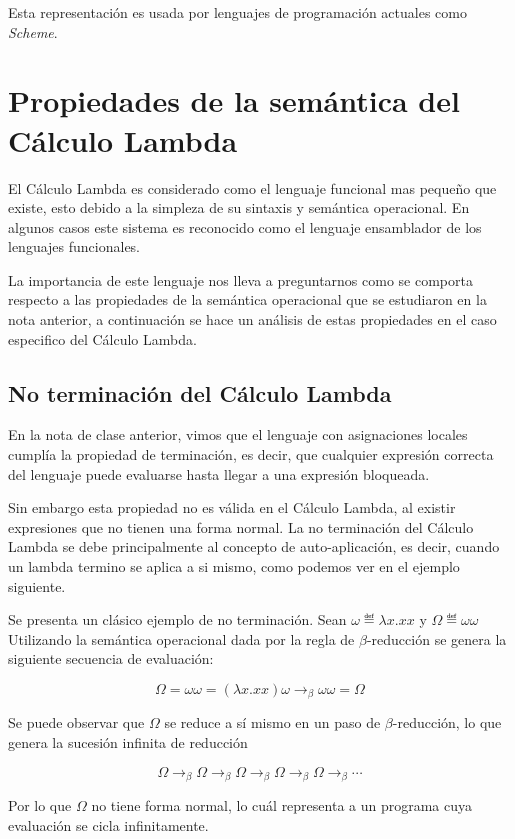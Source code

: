 \documentclass[12pt]{extarticle}
\begin{document}
Esta representación es usada por lenguajes de programación actuales como {\it Scheme}.

\section{Propiedades de la semántica del Cálculo Lambda}
El Cálculo Lambda es considerado como el lenguaje funcional mas pequeño que existe, esto debido a la simpleza de su sintaxis y semántica operacional. En algunos casos este sistema es reconocido como el lenguaje ensamblador de los lenguajes funcionales.

La importancia de este lenguaje nos lleva a preguntarnos como se comporta respecto a las propiedades de la semántica operacional que se estudiaron en la nota anterior, a continuación se hace un análisis de estas propiedades en el caso especifico del Cálculo Lambda.
\subsection{No terminación del Cálculo Lambda}
En la nota de clase anterior, vimos que el lenguaje \ea con asignaciones locales cumplía la propiedad de terminación, es decir, que cualquier expresión correcta del lenguaje puede evaluarse hasta llegar a una expresión bloqueada. 

Sin embargo esta propiedad no es válida en el Cálculo Lambda, al existir expresiones que no tienen una forma normal. La no terminación del Cálculo Lambda se debe principalmente al concepto de auto-aplicación, es decir, cuando un lambda termino se aplica a si mismo, como podemos ver en el ejemplo siguiente.

\begin{example} Se presenta un clásico ejemplo de no terminación. Sean $\omega \eqdef \lambda x.xx$ y $\Omega\eqdef\omega\omega$ Utilizando la semántica operacional dada por la regla de $\beta$-reducción se genera la siguiente secuencia de evaluación:

$$\Omega = \omega\omega=(\lambda x.xx)\omega\to_\beta\omega\omega=\Omega$$

Se puede observar que $\Omega$ se reduce a sí mismo en un paso de $\beta$-reducción, lo que genera la sucesión infinita de reducción

$$\Omega\to_\beta\Omega\to_\beta\Omega\to_\beta\Omega\to_\beta\Omega\to_\beta\cdots$$

Por lo que $\Omega$ no tiene forma normal, lo cuál representa a un programa cuya evaluación se cicla infinitamente.
\end{example}
\end{document}
